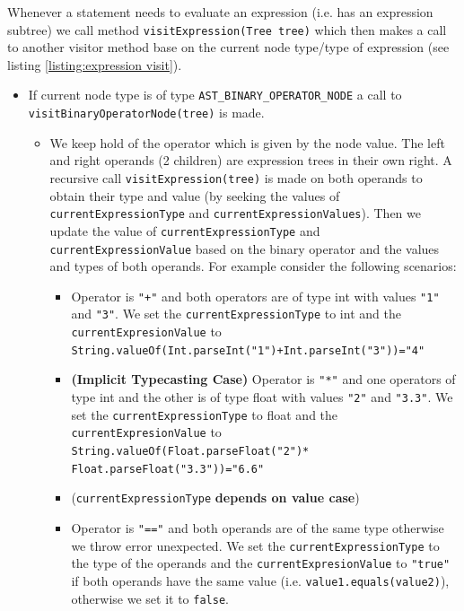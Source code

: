 Whenever a statement  needs to evaluate an expression (i.e. has an expression subtree) we call method \verb!visitExpression(Tree tree)! which then makes a call to another visitor method base on the current node type/type of expression (see listing \ref{listing:expression visit}).
\begin{itemize}
    \item If current node type is of type \verb!AST_BINARY_OPERATOR_NODE! a call to \verb!visitBinaryOperatorNode(tree)! is made. 
    \begin{itemize}
        \item  We keep hold of the operator which is given by the node value. The left and right operands (2 children) are expression trees in their own right. A recursive call \verb!visitExpression(tree)! is made on both operands to obtain their type and value (by seeking the values of \verb!currentExpressionType! and \verb!currentExpressionValues!). Then we update the value of \verb!currentExpressionType! and \verb!currentExpressionValue! based on the binary operator and the values and types of both operands. For example consider the following scenarios:
        \begin{itemize}
            \item Operator is \verb!"+"! and both operators are of type int with values \verb!"1"! and \verb!"3"!. We set the \verb!currentExpressionType! to int and the \verb!currentExpresionValue! to \verb!String.valueOf(Int.parseInt("1")+Int.parseInt("3"))="4"!
               \item \textbf{(Implicit Typecasting Case)} Operator is \verb!"*"! and one  operators  of type int  and the other is of type float with values \verb!"2"! and \verb!"3.3"!. We set the \verb!currentExpressionType! to float and the \verb!currentExpresionValue! to \verb!String.valueOf(Float.parseFloat("2")*!
               \verb!Float.parseFloat("3.3"))="6.6"!
               \item (\verb!currentExpressionType! \textbf{depends on value case})
               \item Operator is \verb!"=="! and both operands are of the same type otherwise we throw error unexpected. We set the \verb!currentExpressionType! to the type of the operands and the \verb!currentExpresionValue! to \verb!"true"! if both operands have the same value (i.e. \verb!value1.equals(value2)!), otherwise we set it to \verb!false!.
        \end{itemize}
    \end{itemize}
 

\end{itemize}
